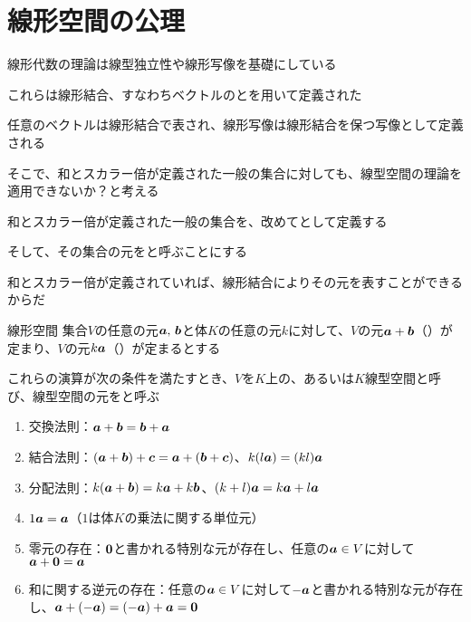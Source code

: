 \documentclass[../../../topic_linear-algebra]{subfiles}
\begin{document}
\sectionline
\section{線形空間の公理}

線形代数の理論は線型独立性や線形写像を基礎にしている

これらは線形結合、すなわちベクトルのとを用いて定義された

任意のベクトルは線形結合で表され、線形写像は線形結合を保つ写像として定義される

\br

そこで、和とスカラー倍が定義された一般の集合に対しても、線型空間の理論を適用できないか？と考える

\br

和とスカラー倍が定義された一般の集合を、改めてとして定義する

そして、その集合の元をと呼ぶことにする

和とスカラー倍が定義されていれば、線形結合によりその元を表すことができるからだ

\begin{definition*}{線形空間}
  集合$V$の任意の元$\vb*{a},\,\vb*{b}$と体$K$の任意の元$k$に対して、$V$の元$\vb*{a} + \vb*{b}$（）が定まり、$V$の元$k\vb*{a}$（）が定まるとする

  これらの演算が次の条件を満たすとき、$V$を$K$上の、あるいは$K$線型空間と呼び、線型空間の元をと呼ぶ

  \begin{enumerate}[label=\romanlabel]
    \item 交換法則：$\vb*{a} + \vb*{b} = \vb*{b} + \vb*{a}$
    \item 結合法則：$(\vb*{a} + \vb*{b}) + \vb*{c} = \vb*{a} + (\vb*{b} + \vb*{c})$、$k(l\vb*{a}) = (kl)\vb*{a}$
    \item 分配法則：$k(\vb*{a} + \vb*{b}) = k\vb*{a} + k\vb*{b}$、$(k + l)\vb*{a} = k\vb*{a} + l\vb*{a}$
    \item $1 \vb*{a} = \vb*{a}$（$1$は体$K$の乗法に関する単位元）
    \item 零元の存在：$\vb*{0}$と書かれる特別な元が存在し、任意の$\vb*{a} \in V$に対して$\vb*{a} + \vb*{0} = \vb*{a}$
    \item 和に関する逆元の存在：任意の$\vb*{a} \in V$に対して$-\vb*{a}$と書かれる特別な元が存在し、$\vb*{a} + (-\vb*{a}) = (-\vb*{a}) + \vb*{a} = \vb*{0}$
  \end{enumerate}
\end{definition*}
\end{document}
